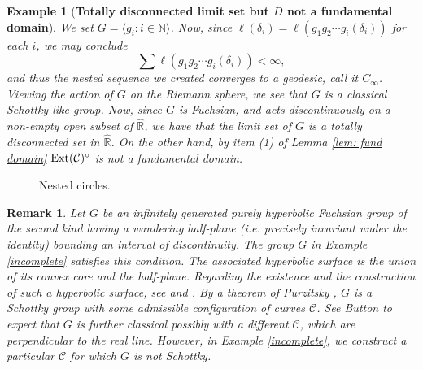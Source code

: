\documentclass[12pt]{amsart}
\theoremstyle{plain}
\newtheorem{rem}[thm]{Remark}
\newtheorem{exam}[thm]{Example}
\DeclareMathOperator{\Ext}{\rm Ext}
\begin{document}
\begin{exam}[{\bf Totally disconnected limit set but $D$ not a fundamental domain}]
{We set 
$G=\langle g_i : i \in \mathbb N\rangle$. 
Now, since 
$\ell(\delta_i)=\ell(g_{1}g_{2}\cdots g_{i}(\delta_{i}))$ for each $i$,
we may conclude
$$\sum \ell(g_{1}g_{2}\cdots g_{i}(\delta_{i}))< \infty,$$
and thus the nested  sequence we created converges to a geodesic, call it $C_{\infty}$.  Viewing the action of $G$ on the Riemann sphere,  we see that $G$ is a  classical 
Schottky-like group.  Now, since $G$ is Fuchsian, and acts discontinuously on a non-empty open subset of 
$\widehat{\mathbb{R}}$, we have that the limit set of $G$ is a totally disconnected set in
$\widehat{\mathbb{R}}$. On the other hand,  by item (1) of Lemma \ref{lem: fund domain}  
$\Ext(\mathcal C)^{\circ}$ is not a fundamental domain. 
}
\end{exam}

\begin{figure}[t]
\begin{center}
\vspace{-1.0cm}
\end{center}
\caption{Nested circles.} \label{fig:NestedCircles}
\end{figure}

\begin{rem}
{\rm
Let $G$ be an infinitely generated purely hyperbolic Fuchsian group of the second kind having a wandering 
half-plane (i.e. precisely invariant under the identity) bounding an interval of discontinuity. The group $G$ in Example \ref{incomplete} satisfies this condition.
The associated hyperbolic surface is the union of its convex core and the
half-plane. Regarding the existence and the construction of such a hyperbolic surface, see \cite{Ba} and \cite{B-S}.
By a theorem of 
Purzitsky \cite{Pur}, $G$ is a Schottky group with {\em some} admissible 
configuration of curves $\mathcal{C}$. See Button \cite{Bu} to expect that $G$ is further classical possibly with a different
$\mathcal{C}$, which are perpendicular to the real line.  
However, in Example \ref{incomplete}, we construct a particular $\mathcal{C}$
for which $G$ is not Schottky.
}
\end{rem}
\end{document}
